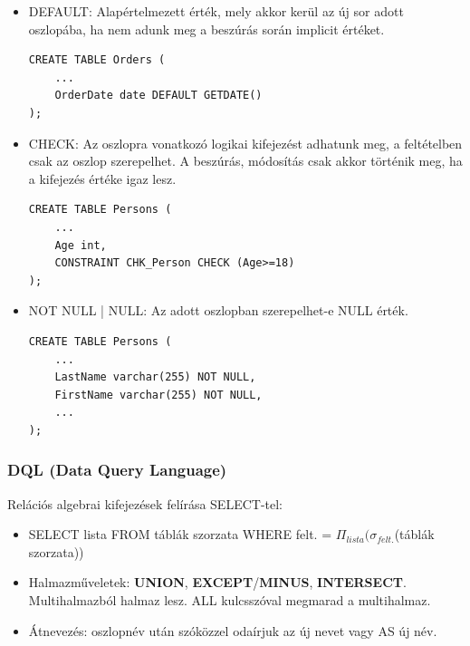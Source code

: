 \documentclass[tikz,12pt,margin=0px]{article}
\begin{document}
\begin{itemize}
{            }
        \item DEFAULT: Alapértelmezett érték, mely akkor kerül az új sor adott oszlopába, ha nem adunk meg a beszúrás során implicit értéket.
            {\small
            \begin{verbatim}
CREATE TABLE Orders (
    ...
    OrderDate date DEFAULT GETDATE()
);
            \end{verbatim}
            }
        \item CHECK: Az oszlopra vonatkozó logikai kifejezést adhatunk meg, a feltételben csak az oszlop szerepelhet. A beszúrás, módosítás csak akkor történik meg, ha a kifejezés értéke igaz lesz.
        {\small
        \begin{verbatim}
CREATE TABLE Persons (
    ...
    Age int,
    CONSTRAINT CHK_Person CHECK (Age>=18)
);
        \end{verbatim}
        }
        \item NOT NULL | NULL: Az adott oszlopban szerepelhet-e NULL érték.
        {\small
        \begin{verbatim}
CREATE TABLE Persons (
    ...
    LastName varchar(255) NOT NULL,
    FirstName varchar(255) NOT NULL,
    ...
);
        \end{verbatim}
        }
    \end{itemize}

	\subsubsection*{DQL (Data Query Language)}

	\noindent Relációs algebrai kifejezések felírása SELECT-tel:
	\begin{itemize}
		\item SELECT lista FROM táblák szorzata WHERE felt. = $\Pi_{lista}\big(\sigma_{felt.}$(táblák szorzata)\big)
		\item Halmazműveletek: \textbf{UNION}, \textbf{EXCEPT}/\textbf{MINUS}, \textbf{INTERSECT}. Multihalmazból halmaz lesz. ALL kulcsszóval megmarad a multihalmaz.
		\item Átnevezés: oszlopnév után szóközzel odaírjuk az új nevet vagy AS új név.
	\end{itemize}
\end{document}
